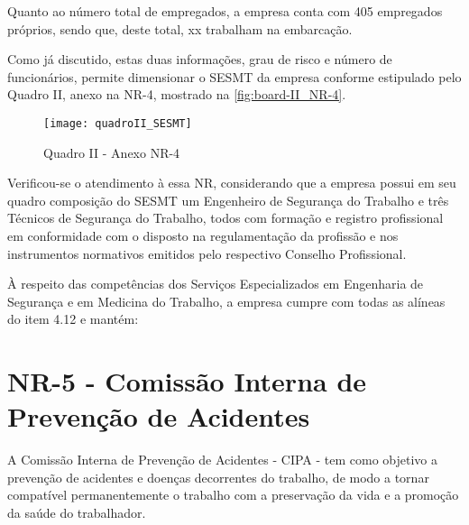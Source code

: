 \documentclass[../main.tex]{subfiles}
\begin{document}
 Quanto ao número total de empregados, a empresa conta com 405 empregados próprios, sendo que, deste total, xx trabalham na embarcação.%
 
 Como já discutido, estas duas informações, grau de risco e número de funcionários, permite dimensionar o SESMT da empresa conforme estipulado pelo Quadro II, anexo na NR-4, mostrado na \autoref{fig:board-II_NR-4}.
 
 \begin{figure}[H]
  \texttt{[image: quadroII\_SESMT]}  
  \caption{Quadro II - Anexo NR-4}  
  \label{fig:board-II_NR-4}
 \end{figure}
 
 Verificou-se o atendimento à essa NR, considerando que a empresa possui em seu quadro composição do SESMT um Engenheiro de Segurança do Trabalho e três Técnicos de Segurança do Trabalho, todos com formação e registro profissional em conformidade com o disposto na regulamentação da profissão e nos instrumentos normativos emitidos pelo respectivo Conselho Profissional. %
 
 À respeito das competências dos Serviços Especializados em Engenharia de Segurança e em Medicina do Trabalho, a empresa cumpre com todas as alíneas do item 4.12 e mantém:
 
 \section{NR-5 - Comissão Interna de Prevenção de Acidentes}
 A Comissão Interna de Prevenção de Acidentes - CIPA - tem como objetivo a prevenção de acidentes e doenças decorrentes do trabalho, de modo a tornar compatível permanentemente o trabalho com a preservação da vida e a promoção da saúde do trabalhador.
 
 
\end{document}
